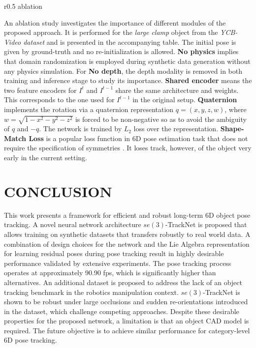 \documentclass[letterpaper, 10 pt, conference]{ieeeconf}
\begin{document}
\begin{wrapfigure}{r}{0.5\linewidth}
\vspace{-0.1in}
{ablation}
\vspace{-0.17in}
\end{wrapfigure}
An ablation study investigates the importance of different modules of the proposed approach. It is performed for the {\it large clamp} object from the {\it YCB-Video dataset} and is presented in the accompanying table. The initial pose is given by ground-truth and no re-initialization is allowed. \textbf{No physics} implies that domain randomization is employed during synthetic data generation without any physics simulation. For \textbf{No depth}, the depth modality is removed in both training and inference stage to study its importance. \textbf{Shared encoder} means the two feature encoders for $I^t$ and $I^{t-1}$ share the same architecture and weights. This corresponds to the one used for $I^{t-1}$ in the original setup. \textbf{Quaternion} implements the rotation via a quaternion representation $q=(x,y,z,w)$, where $w=\sqrt{1-x^2-y^2-z^2}$ is forced to be non-negative so as to avoid the ambiguity of $q$ and $-q$. The network is trained by $L_2$ loss over the representation. \textbf{Shape-Match Loss} is a popular loss function in 6D pose estimation task that does not require the specification of symmetries \cite{xiang2017posecnn}. It loses track, however, of the object very early in the current setting.

 

\section{CONCLUSION}
This work presents a framework for efficient and robust long-term 6D object pose tracking. A novel neural network architecture $se(3)$-TrackNet is proposed that allows training on synthetic datasets that transfers robustly to real world data. A combination of design choices for the network and the Lie Algebra representation for learning residual poses during pose tracking result in highly desirable performance validated by extensive experiments. The pose tracking process operates at approximately 90.90 fps, which is significantly higher than alternatives. An additional dataset is proposed to address the lack of an object tracking benchmark in the robotics manipulation context. $se(3)$-TrackNet is shown to be robust under large occlusions and sudden re-orientations introduced in the dataset, which challenge competing approaches. Despite these desirable properties for the proposed network, a limitation is that an object CAD model is required. The future objective is to achieve similar performance for category-level 6D pose tracking. 






\end{document}
